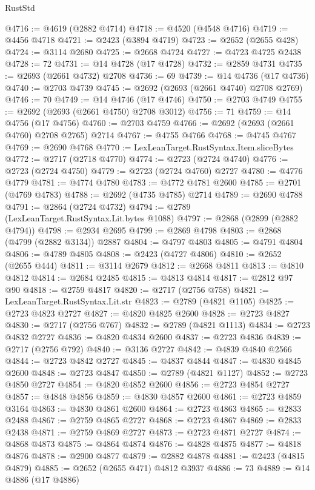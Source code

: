 \begin{lexlean}{RustStd}
\begin{coremodule}
{\begin{coremodule}
{{{{{{{{{{{{{{{{{{{{{{{{{{{{{{{{{{{{{{{@4716 := @4619 (@2882 @4714)
@4718 := @4520 (@4548 @4716)
@4719 := @4456 @4718
@4721 := @2423 (@3894 @4719)
@4723 := @2652 (@2655 @428)
@4724 := @3114 @2680
@4725 := @2668 @4724
@4727 := @4723 @4725 @2438
@4728 := 72
@4731 := @14 @4728 (@17 @4728)
@4732 := @2859 @4731
@4735 := @2693 (@2661 @4732) @2708
@4736 := 69
@4739 := @14 @4736 (@17 @4736)
@4740 := @2703 @4739
@4745 := @2692 (@2693 (@2661 @4740) @2708 @2769)
@4746 := 70
@4749 := @14 @4746 (@17 @4746)
@4750 := @2703 @4749
@4755 := @2692 (@2693 (@2661 @4750) @2708 @3012)
@4756 := 71
@4759 := @14 @4756 (@17 @4756)
@4760 := @2703 @4759
@4766 := @2692 (@2693 (@2661 @4760) @2708 @2765) @2714
@4767 := @4755 @4766
@4768 := @4745 @4767
@4769 := @2690 @4768
@4770 := LexLeanTarget.RustSyntax.Item.sliceBytes
@4772 := @2717 (@2718 @4770)
@4774 := @2723 (@2724 @4740)
@4776 := @2723 (@2724 @4750)
@4779 := @2723 (@2724 @4760) @2727
@4780 := @4776 @4779
@4781 := @4774 @4780
@4783 := @4772 @4781 @2600
@4785 := @2701 (@4769 @4783)
@4788 := @2692 (@4735 @4785) @2714
@4789 := @2690 @4788
@4791 := @2864 (@2724 @4732)
@4794 := @2789 (LexLeanTarget.RustSyntax.Lit.bytes @1088)
@4797 := @2868 (@2899 (@2882 @4794))
@4798 := @2934 @2695
@4799 := @2869 @4798
@4803 := @2868 (@4799 (@2882 @3134)) @2887
@4804 := @4797 @4803
@4805 := @4791 @4804
@4806 := @4789 @4805
@4808 := @2423 (@4727 @4806)
@4810 := @2652 (@2655 @444)
@4811 := @3114 @2679
@4812 := @2668 @4811
@4813 := @4810 @4812
@4814 := @2684 @2485
@4815 := @4813 @4814
@4817 := @2812 @97 @90
@4818 := @2759 @4817
@4820 := @2717 (@2756 @758)
@4821 := LexLeanTarget.RustSyntax.Lit.str
@4823 := @2789 (@4821 @1105)
@4825 := @2723 @4823 @2727
@4827 := @4820 @4825 @2600
@4828 := @2723 @4827
@4830 := @2717 (@2756 @767)
@4832 := @2789 (@4821 @1113)
@4834 := @2723 @4832 @2727
@4836 := @4820 @4834 @2600
@4837 := @2723 @4836
@4839 := @2717 (@2756 @792)
@4840 := @3136 @2727
@4842 := @4839 @4840 @2566
@4844 := @2723 @4842 @2727
@4845 := @4837 @4844
@4847 := @4830 @4845 @2600
@4848 := @2723 @4847
@4850 := @2789 (@4821 @1127)
@4852 := @2723 @4850 @2727
@4854 := @4820 @4852 @2600
@4856 := @2723 @4854 @2727
@4857 := @4848 @4856
@4859 := @4830 @4857 @2600
@4861 := @2723 @4859 @3164
@4863 := @4830 @4861 @2600
@4864 := @2723 @4863
@4865 := @2833 @2488
@4867 := @2759 @4865 @2727
@4868 := @2723 @4867
@4869 := @2833 @2438
@4871 := @2759 @4869 @2727
@4873 := @2723 @4871 @2727
@4874 := @4868 @4873
@4875 := @4864 @4874
@4876 := @4828 @4875
@4877 := @4818 @4876
@4878 := @2900 @4877
@4879 := @2882 @4878
@4881 := @2423 (@4815 @4879)
@4885 := @2652 (@2655 @471) @4812 @3937
@4886 := 73
@4889 := @14 @4886 (@17 @4886)
}}}}}}}}}}}}}}}}}}}}}}}}}}}}}}}}}}}}}}}
\end{coremodule}}
\end{coremodule}
\end{lexlean}
